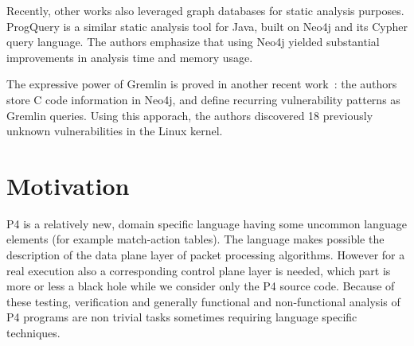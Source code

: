 \documentclass[sigconf]{acmart}
\begin{document}
  Recently, other works also leveraged graph databases for static analysis purposes. ProgQuery \cite{java-static} is a similar static analysis tool for Java, built on Neo4j and its Cypher query language. The authors emphasize that using Neo4j yielded substantial improvements in analysis time and memory usage. 
  
  The expressive power of Gremlin is proved in another recent work~\cite{yamaguchi}: the authors store C code information in Neo4j, and define recurring vulnerability patterns as Gremlin queries. Using this apporach, the authors discovered 18 previously unknown vulnerabilities in the Linux kernel.
	
  


	\section{Motivation}
	


P4 is a relatively new, domain specific language having some uncommon language elements (for example match-action tables). The language makes possible the description of the data plane layer of packet processing algorithms. However for a real execution also a corresponding control plane layer is needed, which part is more or less a black hole while we consider only the P4 source code. Because of these testing, verification and generally functional and non-functional analysis of P4 programs are non trivial tasks sometimes requiring language specific techniques.   
\end{document}
